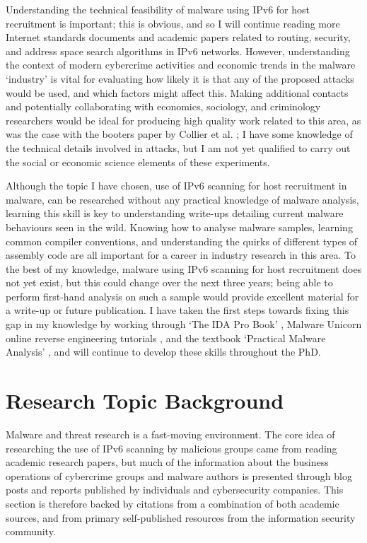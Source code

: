 \documentclass[10pt,sigconf]{acmart}
\begin{document}
Understanding the technical feasibility of malware using IPv6 for host recruitment is important;
this is obvious, and so I will continue reading more Internet standards documents and academic papers related to routing, security, and address space search algorithms in IPv6 networks.
However, understanding the context of modern cybercrime activities and economic trends in the malware `industry' is vital for evaluating how likely it is that any of the proposed attacks would be used, and which factors might affect this.
Making additional contacts and potentially collaborating with economics, sociology, and criminology researchers would be ideal for producing high quality work related to this area, as was the case with the booters paper by Collier et al. \cite{collier2019};
I have some knowledge of the technical details involved in attacks, but I am not yet qualified to carry out the social or economic science elements of these experiments.

Although the topic I have chosen, use of IPv6 scanning for host recruitment in malware, can be researched without any practical knowledge of malware analysis, learning this skill is key to understanding write-ups detailing current malware behaviours seen in the wild.
Knowing how to analyse malware samples, learning common compiler conventions, and understanding the quirks of different types of assembly code are all important for a career in industry research in this area.
To the best of my knowledge, malware using IPv6 scanning for host recruitment does not yet exist, but this could change over the next three years;
being able to perform first-hand analysis on such a sample would provide excellent material for a write-up or future publication.
I have taken the first steps towards fixing this gap in my knowledge by working through `The IDA Pro Book' \cite{ida-book}, Malware Unicorn online reverse engineering tutorials \cite{malware-unicorn}, and the textbook `Practical Malware Analysis' \cite{malware-analysis}, and will continue to develop these skills throughout the PhD.



\section{Research Topic Background}

Malware and threat research is a fast-moving environment.
The core idea of researching the use of IPv6 scanning by malicious groups came from reading academic research papers, but much of the information about the business operations of cybercrime groups and malware authors is presented through blog posts and reports published by individuals and cybersecurity companies.
This section is therefore backed by citations from a combination of both academic sources, and from primary self-published resources from the information security community.
\end{document}
